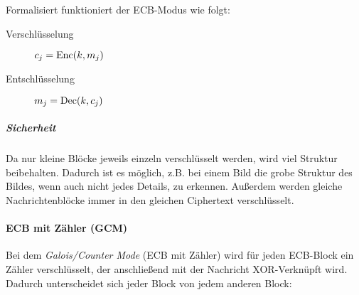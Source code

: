 					Formalisiert funktioniert der ECB-Modus wie folgt:
					\begin{description}
						\item[Verschlüsselung] \( c_j = \operatorname{Enc}(k, m_j) \)
						\item[Entschlüsselung] \( m_j = \operatorname{Dec}(k, c_j) \)
					\end{description}

					\subparagraph{Sicherheit}
						Da nur kleine Blöcke jeweils einzeln verschlüsselt werden, wird viel Struktur beibehalten. Dadurch ist es möglich, z.B. bei einem Bild die grobe Struktur des Bildes, wenn auch nicht jedes Details, zu erkennen. Außerdem werden gleiche Nachrichtenblöcke immer in den gleichen Ciphertext verschlüsselt.

				\paragraph{ECB mit Zähler (GCM)}
					Bei dem \textit{Galois/Counter Mode} (ECB mit Zähler) wird für jeden ECB-Block ein Zähler verschlüsselt, der anschließend mit der Nachricht XOR-Verknüpft wird. Dadurch unterscheidet sich jeder Block von jedem anderen Block:
